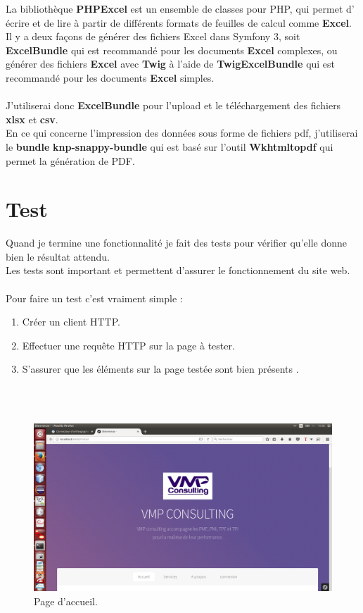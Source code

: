 \documentclass[12pt]{article}
\begin{document}
La bibliothèque \textbf{PHPExcel} est un ensemble de classes pour  PHP, qui  permet d' écrire et de lire à partir de différents formats de feuilles de calcul comme \textbf{Excel}.\\
Il y a deux façons de générer des fichiers Excel dans Symfony 3, soit  \textbf{ExcelBundle} qui est recommandé pour les documents \textbf{Excel}  complexes,   ou  générer des fichiers \textbf{Excel} avec \textbf{Twig} à l'aide de \textbf{TwigExcelBundle}   qui est recommandé pour les documents \textbf{Excel} simples.\\
\\
J'utiliserai donc \textbf{ExcelBundle} pour l'upload et le téléchargement des fichiers \textbf{xlsx} et \textbf{csv}.\\
En ce qui concerne l'impression des données sous forme de fichiers pdf, j'utiliserai le \textbf{bundle}  \textbf{knp-snappy-bundle} qui est basé sur l'outil \textbf{Wkhtmltopdf} qui permet  la génération de PDF.\\

\newpage

\section{Test}

Quand je termine une fonctionnalité je fait des tests pour vérifier qu'elle donne bien le résultat attendu.\\
Les tests sont important et permettent d'assurer le fonctionnement du site web.\\ \\ 
Pour faire un test c'est vraiment simple :
\begin{enumerate}
 \item  Créer un client HTTP.

 \item   Effectuer une requête HTTP sur la page à tester.

\item    S'assurer que les éléments sur la page testée sont bien présents .
\end{enumerate}\\
\\

\begin{figure}[htp]
  \centering
  \includegraphics[width=12cm]{t1.png}
  \caption{Page d'accueil.}
  \label{fig:une-autre-image}
\end{figure}
\end{document}
